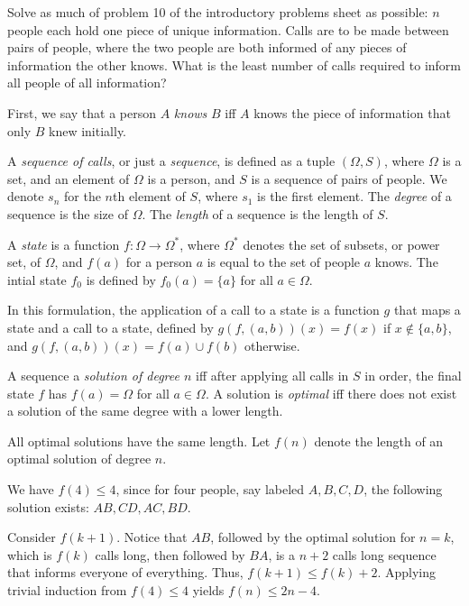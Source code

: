 \documentclass[12pt]{article}
\begin{document}
\begin{question}
    Solve as much of problem 10 of the introductory problems sheet as possible:
    $n$ people each hold one piece of unique information.
    Calls are to be made between pairs of people, where
    the two people are both informed of any pieces of information
    the other knows.
    What is the least number of calls required to inform
    all people of all information?
\end{question}

First, we say that a person $A$ \emph{knows} $B$ iff
$A$ knows the piece of information that only $B$ knew initially.

A \emph{sequence of calls}, or just a \emph{sequence},
is defined as a tuple $(\Omega, S)$,
where $\Omega$ is a set, and an element of $\Omega$ is a person,
and $S$ is a sequence of pairs of people.
We denote $s_n$ for the $n$th element of $S$, where $s_{1}$ is the first element.
The \emph{degree} of a sequence is the size of $\Omega$.
The \emph{length} of a sequence is the length of $S$.

A \emph{state} is a function $f : \Omega \to \Omega^{*}$,
where $\Omega^{*}$ denotes the set of subsets, or power set, of $\Omega$,
and $f(a)$ for a person $a$ is equal to the set of people $a$ knows.
The intial state $f_{0}$ is defined by $f_{0}(a) = \{a\}$ for all $a \in \Omega$.

In this formulation, the application of a call to a state
is a function $g$ that maps a state and a call to a state,
defined by $g(f,(a,b))(x) = f(x)$ if $x \notin \{a,b\}$,
and $g(f,(a,b))(x) = f(a) \cup f(b)$ otherwise.

A sequence a \emph{solution of degree $n$} iff
after applying all calls in $S$ in order,
the final state $f$ has $f(a) = \Omega$ for all $a \in \Omega$.
A solution is \emph{optimal} iff there does not exist
a solution of the same degree with a lower length.

All optimal solutions have the same length.
Let $f(n)$ denote the length of an optimal solution of degree $n$.

We have $f(4) \le 4$, since for four people,
say labeled $A,B,C,D$, the following solution exists: $AB, CD, AC, BD$.

Consider $f(k+1)$.
Notice that $AB$, followed by the optimal solution
for $n=k$, which is $f(k)$ calls long, then followed by $BA$,
is a $n+2$ calls long sequence that informs everyone of everything.
Thus, $f(k+1) \le f(k) + 2$.
Applying trivial induction from $f(4) \le 4$ yields $f(n) \le 2n - 4$.
\end{document}

